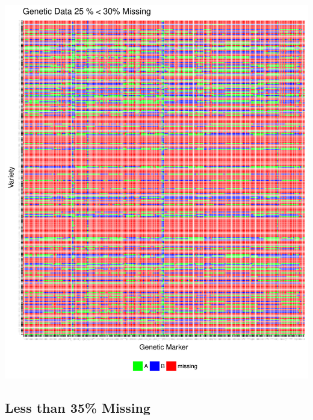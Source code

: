 \documentclass[11pt]{article}\usepackage[]{graphicx}\usepackage[]{color}
\makeatletter
\def\maxwidth{ %
  \ifdim\Gin@nat@width>\linewidth
    \linewidth
  \else
    \Gin@nat@width
  \fi
}
\newenvironment{knitrout}{}{} %
\makeatother
\begin{document}
\begin{knitrout}\footnotesize
{}\color{fgcolor}

{\centering \includegraphics[width=\maxwidth]{figure/missing_plot30-1} 

}



\end{knitrout}

\subsection{Less than 35\% Missing}
\end{document}
